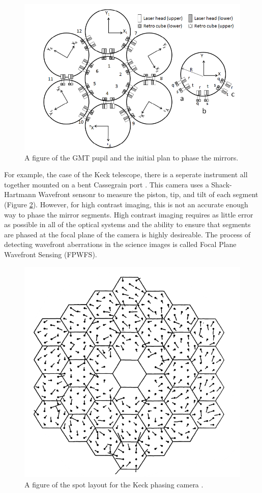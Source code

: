 \begin{figure}[H]
\centering
\includegraphics[width=12 cm]{Figures/GMT_phase_measure.png}
\caption{A figure of the GMT pupil and the initial plan to phase the mirrors\cite{Acton2012PhasingGMT}.}
\label{fig:GMT_phase}
\end{figure}


For example, the case of the Keck telescope, there is a seperate instrument all together mounted on a bent Cassegrain port \cite{Chanan1994}.  This camera uses a Shack-Hartmann Wavefront sensonr to measure the piston, tip, and tilt of each segment (Figure \ref{fig:Keck_phase}).  However, for high contrast imaging, this is not an accurate enough way to phase the mirror segments.  High contrast imaging requires as little error as possible in all of the optical systems and the ability to ensure that segments are phased at the focal plane of the camera is highly desireable.  The process of detecting wavefront aberrations in the science images is called Focal Plane Wavefront Sensing (FPWFS).  

\begin{figure}[H]
\centering
\includegraphics[width=8 cm]{Figures/keck_phasing.png}
\caption{A figure of the spot layout for the Keck phasing camera \cite{Chanan1994}.}
\label{fig:Keck_phase}
\end{figure}


